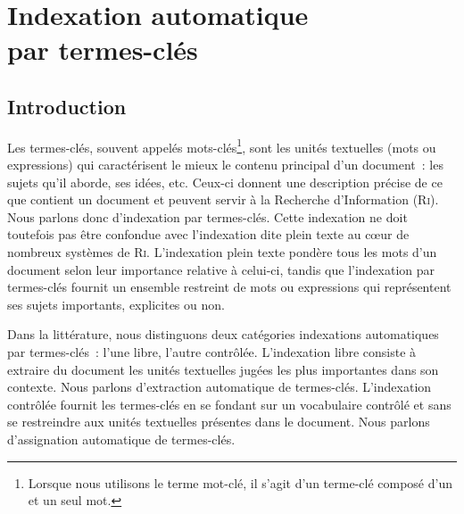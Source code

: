 \chapter[Indexation automatique par termes-clés]{Indexation automatique\\par termes-clés}
\label{part:main-state_of_the_art}
  \section{Introduction}
  \label{sec:main-state_of_the_art-introduction}
    Les termes-clés,
    souvent appelés mots-clés\footnote{Lorsque nous utilisons le terme
    \og{}mot-clé\fg{}, il s'agit d'un terme-clé composé d'un et un seul mot.},
    sont les unités textuelles (mots ou expressions) qui caractérisent le mieux
    le contenu principal d'un document~: les sujets qu'il aborde, ses idées,
    etc. Ceux-ci donnent une description précise de ce que contient un document
    et peuvent servir à la Recherche d'Information (\textsc{Ri}). Nous parlons
    donc d'indexation par termes-clés. Cette indexation ne doit toutefois pas être confondue
    avec l'indexation dite \og{}plein texte\fg{} au c\oe{}ur de nombreux
    systèmes de \textsc{Ri}. L'indexation plein texte pondère tous les mots d'un
    document selon leur importance relative à celui-ci, tandis que l'indexation
    par termes-clés fournit un ensemble restreint de mots ou expressions qui
    représentent ses sujets importants, explicites ou non.

    Dans la littérature, nous distinguons deux catégories indexations
    automatiques par termes-clés~: l'une libre, l'autre contrôlée. L'indexation
    libre consiste à extraire du document les unités textuelles jugées
    les plus importantes dans son contexte. Nous parlons d'extraction
    automatique de termes-clés. L'indexation contrôlée fournit les termes-clés en se fondant sur un vocabulaire
    contrôlé et sans se restreindre aux unités textuelles présentes dans le
    document. Nous parlons d'assignation automatique de
    termes-clés.

